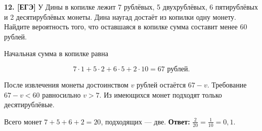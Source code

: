 \begin{task}\label{task-problems-12}
\textbf{12. [ЕГЭ]} У Дины в копилке лежит 7 рублёвых, 5 двухрублёвых, 6 пятирублёвых и 2 десятирублёвых монеты. Дина наугад достаёт из копилки одну монету. Найдите вероятность того, что оставшаяся в копилке сумма составит менее 60 рублей.
\end{task}

\begin{solution}\label{solution-equally-likely-outcomes-problems-12}
Начальная сумма в копилке равна

\[7\cdot1+5\cdot2+6\cdot5+2\cdot10=67\text{ рублей}.\]

После извлечения монеты достоинством $v$ рублей остаётся $67-v$. Требование $67-v<60$ равносильно $v>7$. Из имеющихся монет подходят только десятирублёвые.

Всего монет $7+5+6+2=20$, подходящих — две. \textbf{Ответ:} $\frac2{20}=\frac1{10}=0,1$.
\end{solution}

